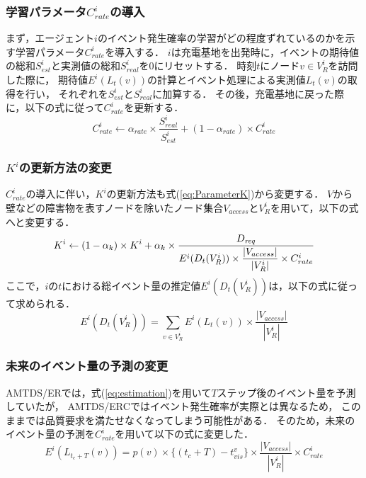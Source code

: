 \documentclass[12pt,a4j,twoside]{jarticle}
\def\Dreq{{D_{\it req}}}
\begin{document}
  \subsubsection{学習パラメータ$C^i_{rate}$の導入}
  まず，エージェント$i$のイベント発生確率の学習がどの程度ずれているのかを示す学習パラメータ$C^i_{rate}$を導入する．
  $i$は充電基地を出発時に，イベントの期待値の総和$S^i_{est}$と実測値の総和$S^i_{real}$を0にリセットする．
  時刻$t$にノード$v \in V^i_R$を訪問した際に，
  期待値$E^i(L_t(v))$の計算とイベント処理による実測値$L_t(v)$の取得を行い，
  それぞれを$S^i_{est}$と$S^i_{real}$に加算する．
  その後，充電基地に戻った際に，以下の式に従って$C^i_{rate}$を更新する．
    \begin{equation}
      C^i_{rate} \gets \alpha_{rate} \times \dfrac{S^i_{real}}{S^i_{est}} + (1-\alpha_{rate}) \times C^i_{rate}
    \end{equation}
  
  \subsubsection{$K^i$の更新方法の変更}
  $C^i_{rate}$の導入に伴い，$K^i$の更新方法も式(\ref{eq:ParameterK})から変更する．
  $V$から壁などの障害物を表すノードを除いたノード集合$V_{access}$と$V^i_R$を用いて，以下の式へと変更する．
  \begin{equation}\label{eq:ParameterK/ERC}
    K^i \gets (1 - \alpha_k) \times K^i + \alpha_k \times \dfrac{\Dreq}{E^i(D_t(V^i_R)) \times \dfrac{|V_{access}|}{|V^i_R|} \times C^i_{rate}}
  \end{equation}
  ここで，$i$の$t$における総イベント量の推定値$E^i(D_t(V^i_R))$は，以下の式に従って求められる．
    \begin{equation}
      E^i(D_t(V^i_R))=\sum_{v\in V^i_R} E^i(L_t(v)) \times \dfrac{|V_{access}|}{|V^i_R|}   
    \end{equation}

  \subsubsection{未来のイベント量の予測の変更}
  AMTDS/ERでは，式(\ref{eq:estimation})を用いて$T$ステップ後のイベント量を予測していたが，
  AMTDS/ERCではイベント発生確率が実際とは異なるため，
  このままでは品質要求を満たせなくなってしまう可能性がある．
  そのため，未来のイベント量の予測を$C^i_{rate}$を用いて以下の式に変更した．
  \begin{equation}
    E^i(L_{t_c+T}(v)) = p(v) \times \{(t_c+T)-t^v_{vis}\} \times \dfrac{|V_{access}|}{|V^i_R|} \times C^i_{rate}
  \end{equation}
  
\end{document}
